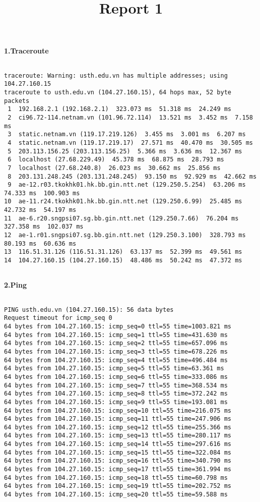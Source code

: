 \documentclass[12pt,a4paper]{article}
\title{Report 1}
\begin{document}
\maketitle
\textbf{1.Traceroute}

\begin{verbatim}

traceroute: Warning: usth.edu.vn has multiple addresses; using 104.27.160.15
traceroute to usth.edu.vn (104.27.160.15), 64 hops max, 52 byte packets
 1  192.168.2.1 (192.168.2.1)  323.073 ms  51.318 ms  24.249 ms
 2  ci96.72-114.netnam.vn (101.96.72.114)  13.521 ms  3.452 ms  7.158 ms
 3  static.netnam.vn (119.17.219.126)  3.455 ms  3.001 ms  6.207 ms
 4  static.netnam.vn (119.17.219.17)  27.571 ms  40.470 ms  30.505 ms
 5  203.113.156.25 (203.113.156.25)  5.366 ms  3.636 ms  12.367 ms
 6  localhost (27.68.229.49)  45.378 ms  68.875 ms  28.793 ms
 7  localhost (27.68.240.8)  26.023 ms  30.662 ms  25.856 ms
 8  203.131.248.245 (203.131.248.245)  93.150 ms  92.929 ms  42.662 ms
 9  ae-12.r03.tkokhk01.hk.bb.gin.ntt.net (129.250.5.254)  63.206 ms  74.333 ms  100.903 ms
10  ae-11.r24.tkokhk01.hk.bb.gin.ntt.net (129.250.6.99)  25.485 ms  42.732 ms  54.197 ms
11  ae-6.r20.sngpsi07.sg.bb.gin.ntt.net (129.250.7.66)  76.204 ms  327.358 ms  102.037 ms
12  ae-1.r01.sngpsi07.sg.bb.gin.ntt.net (129.250.3.100)  328.793 ms  80.193 ms  60.636 ms
13  116.51.31.126 (116.51.31.126)  63.137 ms  52.399 ms  49.561 ms
14  104.27.160.15 (104.27.160.15)  48.486 ms  50.242 ms  47.372 ms 
    
\end{verbatim}
\textbf{2.Ping}

\begin{verbatim}

PING usth.edu.vn (104.27.160.15): 56 data bytes
Request timeout for icmp_seq 0
64 bytes from 104.27.160.15: icmp_seq=0 ttl=55 time=1003.821 ms
64 bytes from 104.27.160.15: icmp_seq=1 ttl=55 time=431.630 ms
64 bytes from 104.27.160.15: icmp_seq=2 ttl=55 time=657.096 ms
64 bytes from 104.27.160.15: icmp_seq=3 ttl=55 time=678.226 ms
64 bytes from 104.27.160.15: icmp_seq=4 ttl=55 time=496.484 ms
64 bytes from 104.27.160.15: icmp_seq=5 ttl=55 time=63.361 ms
64 bytes from 104.27.160.15: icmp_seq=6 ttl=55 time=333.086 ms
64 bytes from 104.27.160.15: icmp_seq=7 ttl=55 time=368.534 ms
64 bytes from 104.27.160.15: icmp_seq=8 ttl=55 time=372.242 ms
64 bytes from 104.27.160.15: icmp_seq=9 ttl=55 time=193.081 ms
64 bytes from 104.27.160.15: icmp_seq=10 ttl=55 time=216.075 ms
64 bytes from 104.27.160.15: icmp_seq=11 ttl=55 time=247.906 ms
64 bytes from 104.27.160.15: icmp_seq=12 ttl=55 time=255.366 ms
64 bytes from 104.27.160.15: icmp_seq=13 ttl=55 time=280.117 ms
64 bytes from 104.27.160.15: icmp_seq=14 ttl=55 time=297.616 ms
64 bytes from 104.27.160.15: icmp_seq=15 ttl=55 time=322.084 ms
64 bytes from 104.27.160.15: icmp_seq=16 ttl=55 time=340.790 ms
64 bytes from 104.27.160.15: icmp_seq=17 ttl=55 time=361.994 ms
64 bytes from 104.27.160.15: icmp_seq=18 ttl=55 time=60.798 ms
64 bytes from 104.27.160.15: icmp_seq=19 ttl=55 time=202.752 ms
64 bytes from 104.27.160.15: icmp_seq=20 ttl=55 time=59.588 ms
    
\end{verbatim}
\end{document}
